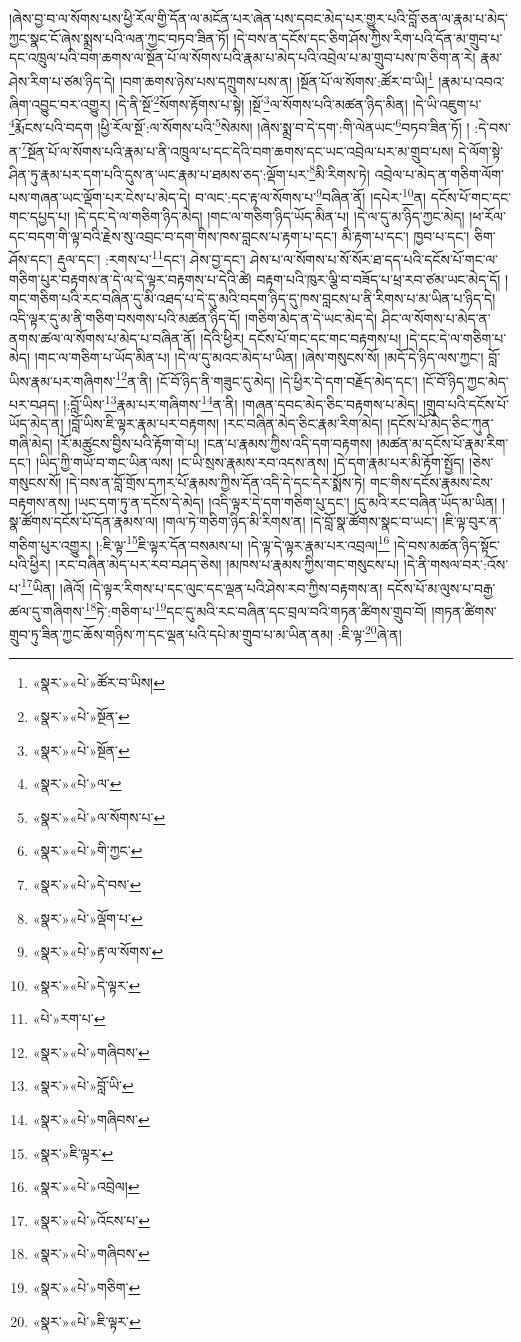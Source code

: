 །ཞེས་བྱ་བ་ལ་སོགས་པས་ཕྱི་རོལ་གྱི་དོན་ལ་མངོན་པར་ཞེན་པས་དབང་མེད་པར་གྱུར་པའི་བློ་ཅན་ལ་རྣམ་པ་མེད་ཀྱང་སྣང་ངོ་ཞེས་སྨྲས་པའི་ལན་ཀྱང་བཏབ་ཟིན་ཏོ། །དེ་བས་ན་དངོས་དང་ཅིག་ཤོས་ཀྱིས་རིག་པའི་དོན་མ་གྲུབ་པ་དང་འཁྲུལ་པའི་བག་ཆགས་ལ་སྔོན་པོ་ལ་སོགས་པའི་རྣམ་པ་མེད་པའི་འབྲེལ་པ་མ་གྲུབ་པས་ཁ་ཅིག་ན་རེ། རྣམ་ཤེས་རིག་པ་ཙམ་ཉིད་དེ། །བག་ཆགས་ཉེས་པས་དཀྲུགས་པས་ན། །སྔོན་པོ་ལ་སོགས་:ཚོར་བ་ཡི།\footnote{«སྣར་»«པེ་»ཚོར་བ་ཡིས།} །རྣམ་པ་འབའ་ཞིག་འབྱུང་བར་འགྱུར། །དེ་ནི་སྔོ་\footnote{«སྣར་»«པེ་»སྔོན་}སོགས་རྟོགས་པ་སྟེ། །སྔོ་\footnote{«སྣར་»«པེ་»སྔོན་}ལ་སོགས་པའི་མཚན་ཉིད་མིན། །དེ་ཡི་འཇུག་པ་\footnote{«སྣར་»«པེ་»ལ་}རྨོངས་པའི་བདག །ཕྱི་རོལ་སྔོ་:ལ་སོགས་པའི་\footnote{«སྣར་»«པེ་»ལ་སོགས་པ་}སེམས། །ཞེས་སྨྲ་བ་དེ་དག་:གི་ལེནཡང་\footnote{«སྣར་»«པེ་»གི་ཀྱང་}བཏབ་ཟིན་ཏོ། །
:དེ་བས་ན་\footnote{«སྣར་»«པེ་»དེ་བས་}སྔོན་པོ་ལ་སོགས་པའི་རྣམ་པ་ནི་འཁྲུལ་པ་དང་དེའི་བག་ཆགས་དང་ཡང་འབྲེལ་པར་མ་གྲུབ་པས། དེ་ལོག་སྟེ་ཤིན་ཏུ་རྣམ་པར་དག་པའི་དུས་ན་ཡང་རྣམ་པ་ཐམས་ཅད་:ལྡོག་པར་\footnote{«སྣར་»«པེ་»ལྡོག་པ་}མི་རིགས་ཏེ། འབྲེལ་པ་མེད་ན་གཅིག་ལོག་པས་གཞན་ཡང་ལྡོག་པར་ངེས་པ་མེད་དེ། བ་ལང་:དང་རྟ་ལ་སོགས་པ་\footnote{«སྣར་»«པེ་»རྟ་ལ་སོགས་}བཞིན་ནོ། །དཔེར་\footnote{«སྣར་»«པེ་»དེ་ལྟར་}ན། དངོས་པོ་གང་དང་གང་དཔྱད་པ། །དེ་དང་དེ་ལ་གཅིག་ཉིད་མེད། །གང་ལ་གཅིག་ཉིད་ཡོད་མིན་པ། །དེ་ལ་དུ་མ་ཉིད་ཀྱང་མེད། །ཕ་རོལ་དང་བདག་གི་ལྟ་བའི་རྗེས་སུ་འབྲང་བ་དག་གིས་ཁས་བླངས་པ་རྟག་པ་དང་། མི་རྟག་པ་དང་། ཁྱབ་པ་དང་། ཅིག་ཤོས་དང་། རྡུལ་དང་། :རགས་པ་\footnote{«པེ་»རག་པ་}དང་། ཤེས་བྱ་དང་། ཤེས་པ་ལ་སོགས་པ་སོ་སོར་ཐ་དད་པའི་དངོས་པོ་གང་ལ་གཅིག་པུར་བརྟགས་ན་དེ་ལ་དེ་ལྟར་བརྟགས་པ་དེའི་ཚེ། བརྟག་པའི་ཁུར་ལྕི་བ་བཟོད་པ་ཕྲ་རབ་ཙམ་ཡང་མེད་དོ། །གང་གཅིག་པའི་རང་བཞིན་དུ་མི་འཐད་པ་དེ་དུ་མའི་བདག་ཉིད་དུ་ཁས་བླངས་པ་ནི་རིགས་པ་མ་ཡིན་པ་ཉིད་དེ། འདི་ལྟར་དུ་མ་ནི་གཅིག་བསགས་པའི་མཚན་ཉིད་དོ། །གཅིག་མེད་ན་དེ་ཡང་མེད་དེ། ཤིང་ལ་སོགས་པ་མེད་ན་ནགས་ཚལ་ལ་སོགས་པ་མེད་པ་བཞིན་ནོ། །དེའི་ཕྱིར། དངོས་པོ་གང་དང་གང་བརྟགས་པ། །དེ་དང་དེ་ལ་གཅིག་པ་མེད། །གང་ལ་གཅིག་པ་ཡོད་མིན་པ། །དེ་ལ་དུ་མའང་མེད་པ་ཡིན། །ཞེས་གསུངས་སོ། །མདོ་དེ་ཉིད་ལས་ཀྱང་། བློ་ཡིས་རྣམ་པར་གཞིགས་\footnote{«སྣར་»«པེ་»གཞིབས་}ན་ནི། །ངོ་བོ་ཉིད་ནི་གཟུང་དུ་མེད། །དེ་ཕྱིར་དེ་དག་བརྗོད་མེད་དང་། །ངོ་བོ་ཉིད་ཀྱང་མེད་པར་བཤད། །:བློ་ཡིས་\footnote{«སྣར་»«པེ་»བློ་ཡི་}རྣམ་པར་གཞིགས་\footnote{«སྣར་»«པེ་»གཞིབས་}ན་ནི། །གཞན་དབང་མེད་ཅིང་བརྟགས་པ་མེད། །གྲུབ་པའི་དངོས་པོ་ཡོད་མེད་ན། །བློ་ཡིས་ཇི་ལྟར་རྣམ་པར་བརྟགས། །རང་བཞིན་མེད་ཅིང་རྣམ་རིག་མེད། །དངོས་པོ་མེད་ཅིང་ཀུན་གཞི་མེད། །རོ་མཚུངས་བྱིས་པའི་རྟོག་གེ་པ། །ངན་པ་རྣམས་ཀྱིས་འདི་དག་བརྟགས། །མཚན་མ་དངོས་པོ་རྣམ་རིག་དང་། །ཡིད་ཀྱི་གཡོ་བ་གང་ཡིན་ལས། །ང་ཡི་སྲས་རྣམས་རབ་འདས་ནས། །དེ་དག་རྣམ་པར་མི་རྟོག་སྤྱོད། །ཅེས་གསུངས་སོ། །དེ་བས་ན་བློ་གྲོས་དཀར་པོ་རྣམས་ཀྱིས་དོན་འདི་དེ་དང་དེར་སྨོས་ཏེ། གང་གིས་དངོས་རྣམས་ངེས་བརྟགས་ནས། །ཡང་དག་ཏུ་ན་དངོས་དེ་མེད། །འདི་ལྟར་དེ་དག་གཅིག་པུ་དང་། །དུ་མའི་རང་བཞིན་ཡོད་མ་ཡིན། །སྣ་ཚོགས་དངོས་པོ་དོན་རྣམས་ལ། །གལ་ཏེ་གཅིག་ཉིད་མི་རིགས་ན། །དེ་བློ་སྣ་ཚོགས་སྣང་བ་ཡང་། །ཇི་ལྟ་བུར་ན་གཅིག་པུར་འགྱུར། །:ཇི་ལྟ་\footnote{«སྣར་»ཇི་ལྟར་}ཇི་ལྟར་དོན་བསམས་པ། །དེ་ལྟ་དེ་ལྟར་རྣམ་པར་འབྲལ།\footnote{«སྣར་»«པེ་»འབྲེལ།} །དེ་བས་མཚན་ཉིད་སྟོང་པའི་ཕྱིར། །རང་བཞིན་མེད་པར་རབ་བཤད་ཅེས། །མཁས་པ་རྣམས་ཀྱིས་གང་གསུངས་པ། །དེ་ནི་གསལ་བར་:འོས་པ་\footnote{«སྣར་»«པེ་»འོངས་པ་}ཡིན། །ཞེའོ། །དེ་ལྟར་རིགས་པ་དང་ལུང་དང་ལྡན་པའི་ཤེས་རབ་ཀྱིས་བརྟགས་ན། དངོས་པོ་མ་ལུས་པ་བརྒྱ་ཚལ་དུ་གཞིགས་\footnote{«སྣར་»«པེ་»གཞིབས་}ཏེ་:གཅིག་པ་\footnote{«སྣར་»«པེ་»གཅིག་}དང་དུ་མའི་རང་བཞིན་དང་བྲལ་བའི་གཏན་ཚིགས་གྲུབ་བོ། །གཏན་ཚིགས་གྲུབ་ཏུ་ཟིན་ཀྱང་ཆོས་གཉིས་ཀ་དང་ལྡན་པའི་དཔེ་མ་གྲུབ་པ་མ་ཡིན་ནམ། :ཇི་ལྟ་\footnote{«སྣར་»«པེ་»ཇི་ལྟར་}ཞེ་ན། 